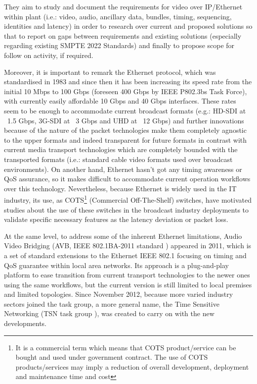They aim to study and document the requirements for video over IP/Ethernet within plant (i.e.: video, audio, ancillary data, bundles, timing, sequencing, identities and latency) in order to research over current and proposed solutions so that to report on gaps between requirements and existing solutions (especially regarding existing SMPTE 2022 Standards) and finally to propose scope for follow on activity, if required.

Moreover, it is important to remark the Ethernet \cite{eth} protocol, which was standardised in 1983 and since then it has been increasing its speed rate from the initial 10 Mbps to 100 Gbps (foreseen 400 Gbps by IEEE P802.3bs \cite{ethbs} Task Force), with currently easily affordable 10 Gbps and 40 Gbps interfaces. These rates seem to be enough to accommodate current broadcast formats (e.g.: HD-SDI at ~1.5 Gbps, 3G-SDI at ~3 Gbps and UHD at ~12 Gbps) and further innovations because of the nature of the packet technologies make them completely agnostic to the upper formats and indeed transparent for future formats in contrast with current media transport technologies which are completely bounded with the transported formats (i.e.: standard cable video formats used over broadcast environments). On another hand, Ethernet hasn't got any timing awareness or QoS assurance, so it makes difficult to accommodate current operation workflows over this technology. Nevertheless, because Ethernet is widely used in the IT industry, its use, as COTS\footnote{It is a commercial term which means that COTS product/service can be bought and used under government contract. The use of COTS products/services may imply a reduction of overall development, deployment and maintenance time and cost} (Commercial Off-The-Shelf) switches, have motivated studies about the use of these switches in the broadcast industry deployments to validate specific necessary features as the latency deviation or packet loss.

At the same level, to address some of the inherent Ethernet limitations, Audio Video Bridging (AVB, IEEE 802.1BA-2011 standard \cite{avb}) appeared in 2011, which is a set of standard extensions to the Ethernet IEEE 802.1 \cite{8021} focusing on timing and QoS guarantee within local area networks. Its approach is a plug-and-play platform to ease transition from current transport technologies to the newer ones using the same workflows, but the current version is still limited to local premises and limited topologies. Since November 2012, because more varied industry sectors joined the task group, a more general name, the Time Sensitive Networking (TSN task group \cite{tsn}), was created to carry on with the new developments.

